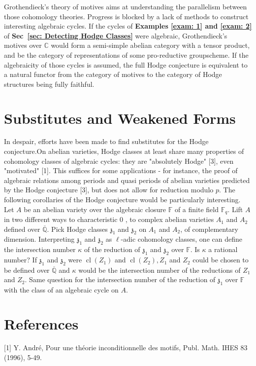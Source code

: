 \documentclass[12pt,twoside]{book}
\theoremstyle{plain}
\theoremstyle{definition}
\theoremstyle{remark}
\numberwithin{equation}{section}
\begin{document}
Grothendieck's theory of motives aims at understanding the parallelism between those cohomology theories. Progress is blocked by a lack of methods to construct interesting algebraic cycles. If the cycles of \textbf{Examples \ref{exam: 1} and \ref{exam: 2}} of \textbf{Sec~\ref{sec: Detecting Hodge Classes}} were algebraic, Grothendieck's motives over $\mathbb{C}$ would form a semi-simple abelian category with a tensor product, and be the category of representations of some pro-reductive groupscheme. If the algebraicity of those cycles is assumed, the full Hodge conjecture is equivalent to a natural functor from the category of motives to the category of Hodge structures being fully faithful.
\section{\bf Substitutes and Weakened Forms}
In despair, efforts have been made to find substitutes for the Hodge conjecture.On abelian varieties, Hodge classes at least share many properties of cohomology classes of algebraic cycles: they are "absolutely Hodge" [3], even "motivated" [1]. This suffices for some applications - for instance, the proof of algebraic relations among periods and quasi periods of abelian varieties predicted by the Hodge conjecture [3], but does not allow for reduction modulo $p$. The following corollaries of the Hodge conjecture would be particularly interesting. Let $A$ be an abelian variety over the algebraic closure $\mathbb{F}$ of a finite field $\mathbb{F}_q$. Lift $A$ in two different ways to characteristic 0 , to complex abelian varieties $A_1$ and $A_2$ defined over $\overline{\mathbb{Q}}$. Pick Hodge classes $\mathfrak{z}_1$ and $\mathfrak{z}_2$ on $A_1$ and $A_2$, of complementary dimension. Interpreting $\mathfrak{z}_1$ and $\mathfrak{z}_2$ as $\ell$-adic cohomology classes, one can define the intersection number $\kappa$ of the reduction of $\mathfrak{z}_1$ and $\mathfrak{z}_2$ over $\mathbb{F}$. Is $\kappa$ a rational number? If $\mathfrak{z}_1$ and $\mathfrak{z}_2$ were $\operatorname{cl}\left(Z_1\right)$ and $\operatorname{cl}\left(Z_2\right), Z_1$ and $Z_2$ could be chosen to be defined over $\overline{\mathbb{Q}}$ and $\kappa$ would be the intersection number of the reductions of $Z_1$ and $Z_2$. Same question for the intersection number of the reduction of $\mathfrak{z}_1$ over $\mathbb{F}$ with the class of an algebraic cycle on $A$.

\section{\bf References}
[1] Y. André, Pour une théorie inconditionnelle des motifs, Publ. Math. IHES 83 (1996), 5-49.
\end{document}

